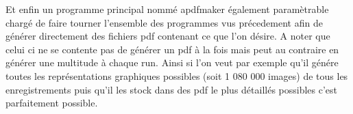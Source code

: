 Et enfin un programme principal nommé apdfmaker également paramètrable chargé de faire tourner l'ensemble des programmes vus précedement afin de générer directement des fichiers pdf contenant ce que l'on désire. A noter que celui ci ne se contente pas de générer un pdf à la fois mais peut au contraire en générer une multitude à chaque run. Ainsi si l'on veut par exemple qu'il génére toutes les représentations graphiques possibles (soit 1 080 000 images) de tous les enregistrements puis qu'il les stock dans des pdf le plus détaillés possibles c'est parfaitement possible.
